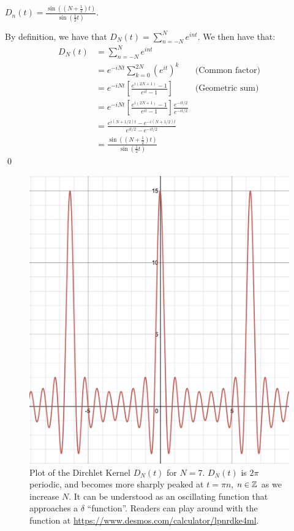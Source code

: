 \begin{nlemma}{ 1}{}
    $D_n(t) = \frac{\sin((N + \frac{1}{2})t)}{\sin(\frac{1}{2}t)}$.
\end{nlemma}

\begin{nproof}
    By definition, we have that $D_N(t) = \sum_{n=-N}^N e^{int}$. We then have that:
    \begin{align*}
        D_N(t) &= \sum_{n=-N}^N e^{int}
        \\ &= e^{-iNt}\sum_{k=0}^{2N}(e^{it})^k & \text{(Common factor)}
        \\ &= e^{-iNt}\left[\frac{e^{i(2N+1)} - 1}{e^{it} - 1}\right] & \text{(Geometric sum)}
        \\ &= e^{-iNt}\left[\frac{e^{i(2N+1)} - 1}{e^{it} - 1}\right]\frac{e^{-it/2}}{e^{-it/2}}
        \\ &= \frac{e^{i(N+1/2)t} - e^{-i(N+1/2)t}}{e^{it/2} - e^{-it/2}}
        \\ &= \frac{\sin((N + \frac{1}{2})t)}{\sin(\frac{1}{2}t)}
    \end{align*} \qed
\end{nproof}

\begin{figure}[htbp]
    \centering
    \includegraphics[scale=0.3]{Images/Dirchlet-graph.png}
    
    \caption{Plot of the Dirchlet Kernel $D_N(t)$ for $N = 7$. $D_N(t)$ is $2\pi$ periodic, and becomes more sharply peaked at $t = \pi n$, $n \in \mathbb{Z}$ as we increase $N$. It can be understood as an oscillating function that approaches a $\delta$ ``function''. Readers can play around with the function at \url{https://www.desmos.com/calculator/lpnrdke4ml}.}
    \label{fig56}
\end{figure}

